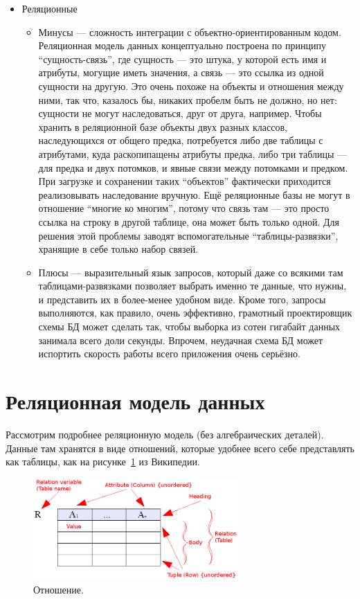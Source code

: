 \documentclass[a5paper]{article}
\begin{document}
\begin{itemize}
	\item Реляционные
	\begin{itemize}
		\item Минусы --- сложность интеграции с объектно-ориентированным кодом. Реляционная модель данных концептуально построена по принципу ``сущность-связь'', где сущность --- это штука, у которой есть имя и атрибуты, могущие иметь значения, а связь --- это ссылка из одной сущности на другую. Это очень похоже на объекты и отношения между ними, так что, казалось бы, никаких пробелм быть не должно, но нет: сущности не могут наследоваться, друг от друга, например. Чтобы хранить в реляционной базе объекты двух разных классов, наследующихся от общего предка, потребуется либо две таблицы с атрибутами, куда раскопипащены атрибуты предка, либо три таблицы --- для предка и двух потомков, и явные связи между потомками и предком. При загрузке и сохранении таких ``объектов'' фактически приходится реализовывать наследование вручную. Ещё реляционные базы не могут в отношение ``многие ко многим'', потому что связь там --- это просто ссылка на строку в другой таблице, она может быть только одной. Для решения этой проблемы заводят вспомогательные ``таблицы-развязки'', хранящие в себе только набор связей.
		\item Плюсы --- выразительный язык запросов, который даже со всякими там таблицами-развязками позволяет выбрать именно те данные, что нужны, и представить их в более-менее удобном виде. Кроме того, запросы выполняются, как правило, очень эффективно, грамотный проектировщик схемы БД может сделать так, чтобы выборка из сотен гигабайт данных занимала всего доли секунды. Впрочем, неудачная схема БД может испортить скорость работы всего приложения очень серьёзно.
	\end{itemize}
\end{itemize}

\section{Реляционная модель данных}

Рассмотрим подробнее реляционную модель (без алгебраических деталей). Данные там хранятся в виде отношений, которые удобнее всего себе представлять как таблицы, как на рисунке~\ref{image:table} из Википедии.

\begin{figure}
	\begin{center}
		\includegraphics[width=0.7\textwidth]{relationalModel.png}
	\end{center}
	\caption{Отношение.}
	\label{image:table}
\end{figure}
\end{document}
